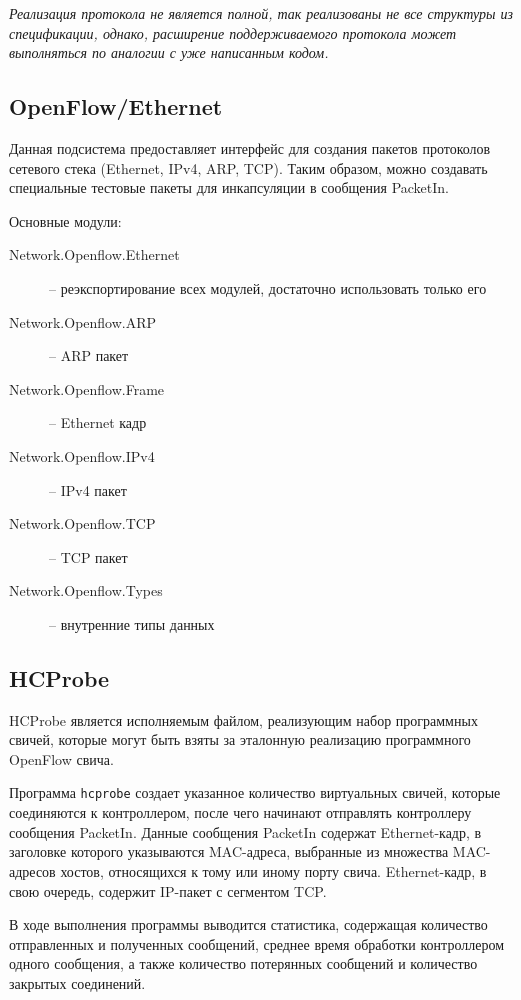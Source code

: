\documentclass[9pt,a4paper]{article}
\begin{document}
\emph{Реализация протокола не является полной, так реализованы не все структуры из
спецификации, однако, расширение поддерживаемого протокола может выполняться по аналогии с
уже написанным кодом.}

\subsection{OpenFlow/Ethernet}

Данная подсистема предоставляет интерфейс для создания пакетов протоколов сетевого стека
(Ethernet, IPv4, ARP, TCP). Таким образом, можно создавать специальные тестовые пакеты
для инкапсуляции в сообщения PacketIn.

Основные модули:

\begin{description}
  \item[Network.Openflow.Ethernet] -- реэкспортирование всех модулей, достаточно использовать только его
  \item[Network.Openflow.ARP]      -- ARP пакет
  \item[Network.Openflow.Frame]    -- Ethernet кадр
  \item[Network.Openflow.IPv4]     -- IPv4 пакет
  \item[Network.Openflow.TCP]      -- TCP пакет
  \item[Network.Openflow.Types]    -- внутренние типы данных
\end{description}

\subsection{HCProbe}

HCProbe является исполняемым файлом, реализующим набор программных свичей, которые могут
быть взяты за эталонную реализацию программного OpenFlow свича.

Программа \texttt{hcprobe} создает указанное количество виртуальных свичей,
которые соединяются к контроллером, после чего начинают отправлять контроллеру сообщения PacketIn.
Данные сообщения PacketIn содержат Ethernet-кадр, в заголовке которого указываются MAC-адреса,
выбранные из множества MAC-адресов хостов, относящихся к тому или иному порту свича.
Ethernet-кадр, в свою очередь, содержит IP-пакет с сегментом TCP.

В ходе выполнения программы выводится статистика, содержащая количество отправленных и
полученных сообщений, среднее время обработки контроллером одного сообщения, а также
количество потерянных сообщений и количество закрытых соединений.
\end{document}
